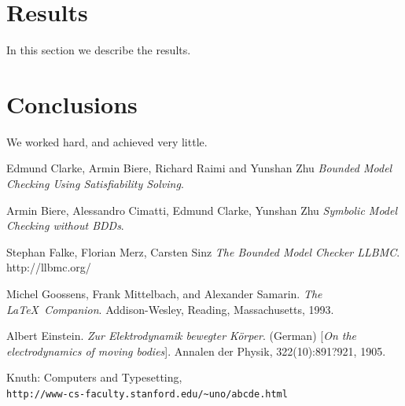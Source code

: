 \documentclass[14pt]{article}
\begin{document}
\section{Results}\label{results}
In this section we describe the results.

\section{Conclusions}\label{conclusions}
We worked hard, and achieved very little.

\begin{thebibliography}{9}
Edmund Clarke, Armin Biere, Richard Raimi and Yunshan Zhu
\textit{Bounded Model Checking Using Satisfiability Solving}.

Armin Biere, Alessandro Cimatti, Edmund Clarke, Yunshan Zhu
\textit{Symbolic Model Checking without BDDs}. 

Stephan Falke, Florian Merz, Carsten Sinz
\textit{The Bounded Model Checker LLBMC}. 
http://llbmc.org/





Michel Goossens, Frank Mittelbach, and Alexander Samarin. 
\textit{The \LaTeX\ Companion}. 
Addison-Wesley, Reading, Massachusetts, 1993.
 
Albert Einstein. 
\textit{Zur Elektrodynamik bewegter K{\"o}rper}. (German) 
[\textit{On the electrodynamics of moving bodies}]. 
Annalen der Physik, 322(10):891?921, 1905.
 
Knuth: Computers and Typesetting,
\\\texttt{http://www-cs-faculty.stanford.edu/\~{}uno/abcde.html}
\end{thebibliography}
\end{document}
